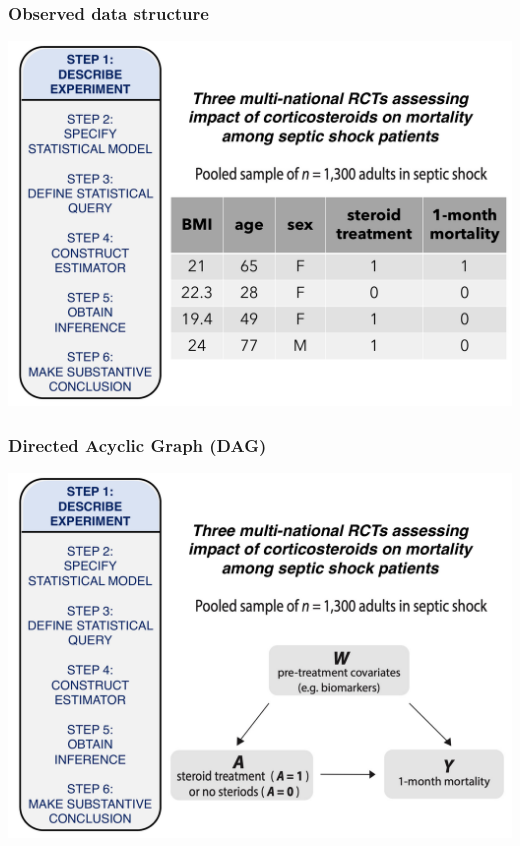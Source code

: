 \documentclass[t]{beamer}
\begin{document}
\begin{frame}
  \frametitle{Observed data structure}
  \vspace{-20pt}
  \begin{center}
  \includegraphics[width = 1.05\textwidth]{figures/data_table.pdf}
  \end{center}
\end{frame}

\begin{frame}
  \frametitle{Directed Acyclic Graph (DAG)}
  \vspace{-20pt}
  \begin{center}
  \includegraphics[width = 1.05\textwidth]{figures/DAG.pdf}
  \end{center}
\end{frame}
\end{document}
